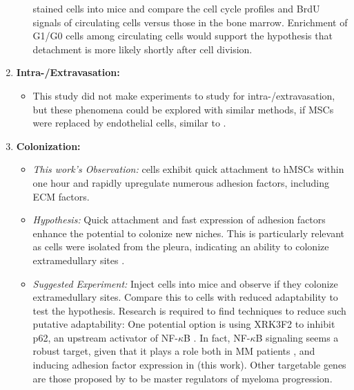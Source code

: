 \begin{enumerate}
\begin{itemize}
                        stained \INA cells into mice and compare the cell cycle
                        profiles and BrdU signals of circulating cells versus
                        those in the bone marrow. Enrichment of G1/G0 cells
                        among circulating cells would support the hypothesis
                        that detachment is more likely shortly after cell
                        division.
            \end{itemize}
      \item \textbf{Intra-/Extravasation:}
            \begin{itemize}
                  \item This study did not make experiments to study for
                        intra-/extravasation, but these phenomena could be
                        explored with similar methods, if MSCs were replaced by
                        endothelial cells, similar to
                        \citet{solimandoJAMAPrognosticFactor2018}.
            \end{itemize}
      \item \textbf{Colonization:}
            \begin{itemize}
                  \item \textit{This work's Observation:} \INA cells exhibit quick
                        attachment to \acp{hMSC} within one hour and rapidly
                        upregulate numerous adhesion factors, including \ac{ECM}
                        factors.
                  \item \textit{Hypothesis:} Quick attachment and fast
                        expression of adhesion factors enhance the potential to
                        colonize new niches. This is particularly relevant as \INA
                        cells were isolated from the pleura, indicating an ability to
                        colonize extramedullary sites
                        \cite{burgerGp130RasMediated2001c}.
                  \item \textit{Suggested Experiment:} Inject \INA cells into mice and
                        observe if they colonize extramedullary sites. Compare
                        this to \INA cells with reduced adaptability to test the
                        hypothesis. Research is required to find techniques to
                        reduce such putative adaptability: One potential option
                        is using XRK3F2 to inhibit p62, an upstream activator of
                        NF-$\kappa$B \cite{adamikXRK3F2InhibitionP62ZZ2018}. In
                        fact, NF-$\kappa$B signaling seems a robust target,
                        given that it plays a role both in MM patients
                        \cite{sarinEvaluatingEfficacyMultiple2020}, and inducing
                        adhesion factor expression in \INA (this work). Other
                        targetable genes are those proposed by
                        \citet{shenProgressionSignatureUnderlies2021} to be
                        master regulators of myeloma progression.
            \end{itemize}
\end{enumerate}


